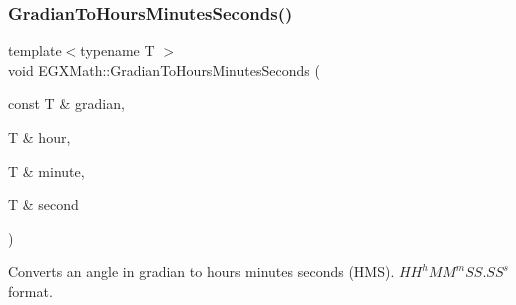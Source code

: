 \mbox{\label{group___e_g_x_math-_angle_conversions-_gradian_gaf174cf5b716d5a490b3744ffe9ff3b97}} 
\subsubsection{\texorpdfstring{Gradian\+To\+Hours\+Minutes\+Seconds()}{GradianToHoursMinutesSeconds()}}
{\footnotesize\ttfamily template$<$typename T $>$ \\
void E\+G\+X\+Math\+::\+Gradian\+To\+Hours\+Minutes\+Seconds (\begin{DoxyParamCaption}\item[{const T \&}]{gradian,  }\item[{T \&}]{hour,  }\item[{T \&}]{minute,  }\item[{T \&}]{second }\end{DoxyParamCaption})}



Converts an angle in gradian to hours minutes seconds (H\+MS). ${HH}^h{MM}^m{SS.SS}^s$ format. 


